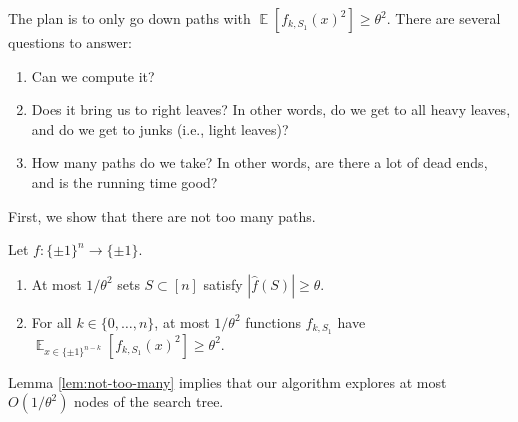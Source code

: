 \documentclass[letterpaper, reqno,11pt]{article}
\newcommand{\EE}{\mathop{{}\mathbb{E}}}
\begin{document}
The plan is to only go down paths with $\EE[f_{k, S_1}(x)^2] \geq \theta^2$. There are several questions to answer:
\begin{enumerate}[label=(\roman*), itemsep=0pt]
  \item Can we compute it?
  \item Does it bring us to right leaves? In other words, do we get to all heavy leaves, and do we get to junks (i.e., light leaves)?
  \item How many paths do we take? In other words, are there a lot of dead ends, and is the running time good?
\end{enumerate}

First, we show that there are not too many paths.

\begin{lemma} \label{lem:not-too-many}
  Let $f : \{ \pm 1 \}^n \to \{ \pm 1 \}$.
  \begin{enumerate}[label=(\roman*), itemsep=0pt]
    \item At most $1/\theta^2$ sets $S \subset [n]$ satisfy $|\hat{f}(S)| \geq \theta$.
    \item For all $k \in \{ 0, \ldots, n \}$, at most $1/\theta^2$ functions $f_{k, S_1}$ have $\EE_{x \in \{ \pm 1 \}^{n - k}}[f_{k, S_1}(x)^2] \geq \theta^2$.
  \end{enumerate}
\end{lemma}

Lemma \ref{lem:not-too-many} implies that our algorithm explores at most $O(1/\theta^2)$ nodes of the search tree.
\end{document}
